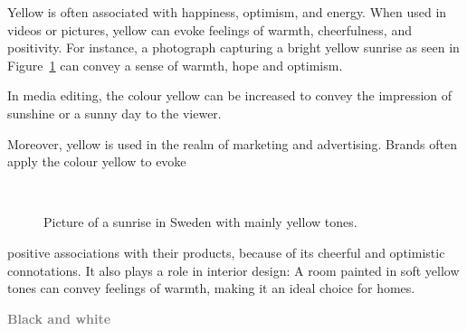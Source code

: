 \documentclass[../MasterThesis.tex]{subfiles}
\begin{document}
%
\begin{minipage}{0.45\textwidth}
	Yellow is often associated with happiness, optimism, and energy. When used in videos or pictures, yellow can evoke feelings of warmth, cheerfulness, and positivity. For instance, a photograph capturing a bright yellow sunrise as seen in Figure~\ref{figure:yellow} can convey a sense of warmth, hope and optimism.
	
	In media editing, the colour yellow can be increased to convey the impression of sunshine or a sunny day to the viewer.
	
	Moreover, yellow is used in the realm of marketing and advertising. Brands often apply the colour yellow to evoke 
	
	
\end{minipage}\begin{minipage}{0.05\textwidth}
	\ 
\end{minipage}\begin{minipage}{0.5\textwidth}
	\begin{figure}[H]
		\begin{center}
			\caption[Picture of a sunrise in Sweden with mainly yellow tones.]{Picture of a sunrise in Sweden with mainly yellow tones.}
			\label{figure:yellow}
		\end{center}
	\end{figure}\hfill
\end{minipage}

positive associations with their products, because of its cheerful and optimistic connotations. It also plays a role in interior design: A room painted in soft yellow tones can convey feelings of warmth, making it an ideal choice for homes.~\cite{colour2}





\textbf{\textcolor{gray}{Black and white}}
\end{document}
